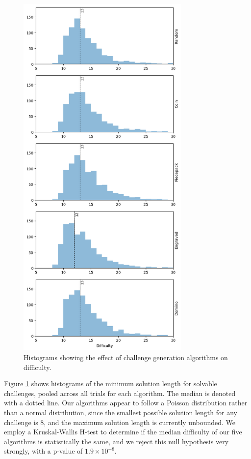 \documentclass[journal]{IEEEtran}
\begin{document}
\begin{figure}[t]
\centering
\includegraphics[width=8.5cm]{standalonediff.png}
\caption{Histograms showing the effect of challenge generation algorithms on difficulty.}
\label{fig:difficultycomp}
\end{figure}

Figure \ref{fig:difficultycomp} shows histograms of the minimum solution length for solvable challenges, pooled across all trials for each algorithm. The median is denoted with a dotted line. Our algorithms appear to follow a Poisson distribution rather than a normal distribution, since the smallest possible solution length for any challenge is 8, and the maximum solution length is currently unbounded. We employ a Kruskal-Wallis H-test \cite{KRUSKAL} to determine if the median difficulty of our five algorithms is statistically the same, and we reject this null hypothesis very strongly, with a p-value of $1.9 \times 10^{-8}$.
\end{document}
